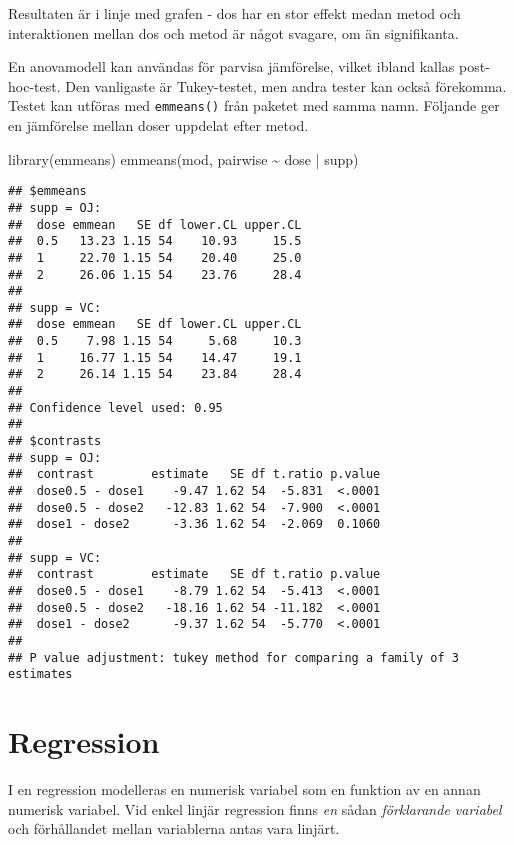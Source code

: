 \documentclass[
]{book}
\newenvironment{Shaded}{\begin{snugshade}}{\end{snugshade}}
\newcommand{\FunctionTok}[1]{\textcolor[rgb]{0.00,0.00,0.00}{#1}}
\newcommand{\NormalTok}[1]{#1}
\newcommand{\SpecialCharTok}[1]{\textcolor[rgb]{0.00,0.00,0.00}{#1}}
\theoremstyle{definition}
\theoremstyle{definition}
\theoremstyle{definition}
\theoremstyle{definition}
\theoremstyle{remark}
\begin{document}
Resultaten är i linje med grafen - dos har en stor effekt medan metod och interaktionen mellan dos och metod är något svagare, om än signifikanta.

En anovamodell kan användas för parvisa jämförelse, vilket ibland kallas post-hoc-test. Den vanligaste är Tukey-testet, men andra tester kan också förekomma. Testet kan utföras med \texttt{emmeans()} från paketet med samma namn. Följande ger en jämförelse mellan doser uppdelat efter metod.

\begin{Shaded}
\begin{Highlighting}[]
\FunctionTok{library}\NormalTok{(emmeans)}
\FunctionTok{emmeans}\NormalTok{(mod, pairwise }\SpecialCharTok{\textasciitilde{}}\NormalTok{ dose }\SpecialCharTok{|}\NormalTok{ supp)}
\end{Highlighting}
\end{Shaded}

\begin{verbatim}
## $emmeans
## supp = OJ:
##  dose emmean   SE df lower.CL upper.CL
##  0.5   13.23 1.15 54    10.93     15.5
##  1     22.70 1.15 54    20.40     25.0
##  2     26.06 1.15 54    23.76     28.4
## 
## supp = VC:
##  dose emmean   SE df lower.CL upper.CL
##  0.5    7.98 1.15 54     5.68     10.3
##  1     16.77 1.15 54    14.47     19.1
##  2     26.14 1.15 54    23.84     28.4
## 
## Confidence level used: 0.95 
## 
## $contrasts
## supp = OJ:
##  contrast        estimate   SE df t.ratio p.value
##  dose0.5 - dose1    -9.47 1.62 54  -5.831  <.0001
##  dose0.5 - dose2   -12.83 1.62 54  -7.900  <.0001
##  dose1 - dose2      -3.36 1.62 54  -2.069  0.1060
## 
## supp = VC:
##  contrast        estimate   SE df t.ratio p.value
##  dose0.5 - dose1    -8.79 1.62 54  -5.413  <.0001
##  dose0.5 - dose2   -18.16 1.62 54 -11.182  <.0001
##  dose1 - dose2      -9.37 1.62 54  -5.770  <.0001
## 
## P value adjustment: tukey method for comparing a family of 3 estimates
\end{verbatim}

\hypertarget{regression}{%
\section{Regression}\label{regression}}

I en regression modelleras en numerisk variabel som en funktion av en annan numerisk variabel. Vid enkel linjär regression finns \emph{en} sådan \emph{förklarande variabel} och förhållandet mellan variablerna antas vara linjärt.
\end{document}
